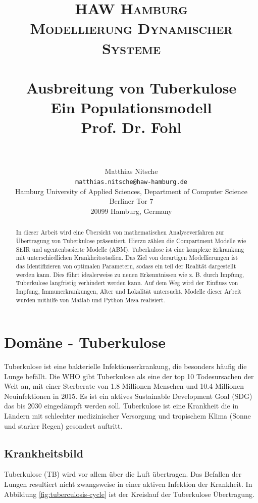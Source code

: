 \documentclass[paper=a4, fontsize=11pt, ngerman, abstract=on]{scrartcl}
\title {
  \normalfont \normalsize
  \textsc{HAW Hamburg} \\ [25pt]
  \textsc{Modellierung Dynamischer Systeme} \\ [15pt]
  \horrule{0.5pt} \\[0.4cm] %
  \huge Ausbreitung von Tuberkulose \\ [15pt] %
  \small Ein Populationsmodell \\ [15pt]
  \small Prof. Dr. Fohl \\
  \horrule{1pt} \\[0.5cm] %
}
\author{
  Matthias Nitsche \\
  \texttt{matthias.nitsche@haw-hamburg.de} \\
  \small{Hamburg University of Applied Sciences, Department of Computer Science} \\
  \small{Berliner Tor 7} \\
  \small{20099 Hamburg, Germany} \\
}
\numberwithin{equation}{section} %
\numberwithin{figure}{section} %
\numberwithin{table}{section} %
\begin{document}
\maketitle

\begin{abstract}
In dieser Arbeit wird eine Übersicht von mathematischen Analyseverfahren zur Übertragung von Tuberkulose präsentiert. Hierzu zählen die Compartment Modelle wie SEIR und agentenbasierte Modelle (ABM). Tuberkulose ist eine komplexe Erkrankung mit unterschiedlichen Krankheitsstadien. Das Ziel von derartigen Modellierungen ist das Identifizieren von optimalen Parametern, sodass ein teil der Realität dargestellt werden kann. Dies führt idealerweise zu neuen Erkenntnissen wie z. B. durch Impfung, Tuberkulose langfristig verhindert werden kann. Auf dem Weg wird der Einfluss von Impfung, Immunerkrankungen, Alter und Lokalität untersucht. Modelle dieser Arbeit wurden mithilfe von Matlab und Python Mesa realisiert.
\end{abstract}

\newpage

\renewcommand{\cftsecleader}{\cftdotfill{\cftdotsep}}
\tableofcontents

\newpage

\section{Domäne - Tuberkulose}

Tuberkulose ist eine bakterielle Infektionserkrankung, die besonders häufig die Lunge befällt. Die WHO gibt Tuberkulose als eine der top 10 Todesursachen der Welt an, mit einer Sterberate von 1.8 Millionen Menschen und 10.4 Millionen Neuinfektionen in 2015. Es ist ein aktives Sustainable Development Goal (SDG) das bis 2030 eingedämpft werden soll. Tuberkulose ist eine Krankheit die in Ländern mit schlechter medizinischer Versorgung und tropischem Klima (Sonne und starker Regen) gesondert auftritt. \cite{WHOTB2016}

\subsection{Krankheitsbild}

Tuberkulose (TB) wird vor allem über die Luft übertragen. Das Befallen der Lungen resultiert nicht zwangsweise in einer aktiven Infektion der Krankheit. In Abbildung \ref{fig:tuberculosis-cycle} ist der Kreislauf der Tuberkulose Übertragung.
\end{document}
